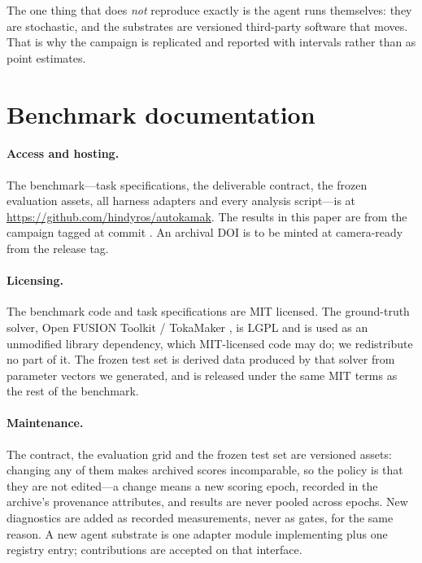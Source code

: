 The one thing that does \emph{not} reproduce exactly is the agent runs
themselves: they are stochastic, and the substrates are versioned third-party
software that moves. That is why the campaign is replicated and reported with
intervals rather than as point estimates.

\section{Benchmark documentation}
\label{app:datasheet}

\paragraph{Access and hosting.}
The benchmark---task specifications, the deliverable contract, the frozen
evaluation assets, all harness adapters and every analysis script---is at
\url{https://github.com/hindyros/autokamak}. The results in this paper are from
the campaign tagged  at commit . An
archival DOI is to be minted at camera-ready from the release tag.

\paragraph{Licensing.}
The benchmark code and task specifications are MIT licensed. The ground-truth
solver, Open FUSION Toolkit / TokaMaker \citep{hansen2024tokamaker}, is LGPL and
is used as an unmodified library dependency, which MIT-licensed code may do; we
redistribute no part of it. The frozen test set is derived data produced by that
solver from parameter vectors we generated, and is released under the same MIT
terms as the rest of the benchmark.

\paragraph{Maintenance.}
The contract, the evaluation grid and the frozen test set are versioned assets:
changing any of them makes archived scores incomparable, so the policy is that
they are not edited---a change means a new scoring epoch, recorded in the
archive's provenance attributes, and results are never pooled across epochs. New
diagnostics are added as recorded measurements, never as gates, for the same
reason. A new agent substrate is one adapter module implementing
 plus one registry entry;
contributions are accepted on that interface.

